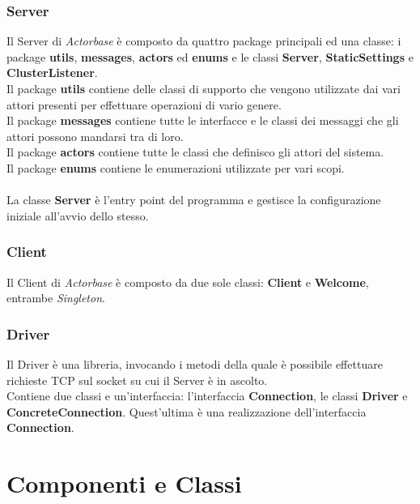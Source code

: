 \documentclass[a4paper]{article}
\begin{document}
        \subsubsection{Server}
		
        	Il Server di \emph{Actorbase} è composto da quattro package principali ed una classe: 
			i package \textbf{utils}, \textbf{messages}, \textbf{actors} ed \textbf{enums} e le classi \textbf{Server}, \textbf{StaticSettings} e \textbf{ClusterListener}. \\
			
			Il package \textbf{utils} contiene delle classi di supporto che vengono utilizzate dai vari attori presenti per effettuare operazioni 
			di vario genere. \\
			Il package \textbf{messages} contiene tutte le interfacce e le classi dei messaggi che gli attori possono mandarsi tra di loro. \\
			Il package \textbf{actors} contiene tutte le classi che definisco gli attori del sistema. \\
			Il package \textbf{enums} contiene le enumerazioni utilizzate per vari scopi. \\
			\\
			\noindent La classe \textbf{Server} è l'entry point del programma e gestisce la configurazione iniziale all'avvio dello stesso.  
			            
		
        \subsubsection{Client}
		
        	Il Client di \emph{Actorbase} è composto da due sole classi: \textbf{Client} e \textbf{Welcome}, entrambe \emph{Singleton}.

        \subsubsection{Driver}
		
        	Il Driver è una libreria, invocando i metodi della quale è possibile effettuare richieste TCP sul socket su cui il
			Server è in ascolto. \\
			Contiene due classi e un'interfaccia: l'interfaccia \textbf{Connection}, le classi \textbf{Driver} e \textbf{ConcreteConnection}. 
			Quest'ultima è una realizzazione dell'interfaccia \textbf{Connection}. 

				
	\newpage 
	\section{Componenti e Classi}
	
\end{document}
